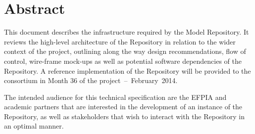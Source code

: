 \section*{Abstract}
\label{abstract}
This document describes the infrastructure required by the \ddmore Model Repository. It reviews the high-level architecture of the Repository in relation to the wider context of the project, outlining along the way design recommendations, flow of control, wire-frame mock-ups as well as potential software dependencies of the Repository. A reference implementation of the Repository will be provided to the consortium in Month 36 of the \mbox{project -- February 2014}. 

The intended audience for this technical specification are the EFPIA and academic partners that are interested in the development of an instance of the Repository, as well as stakeholders that wish to interact with the Repository in an optimal manner. 
